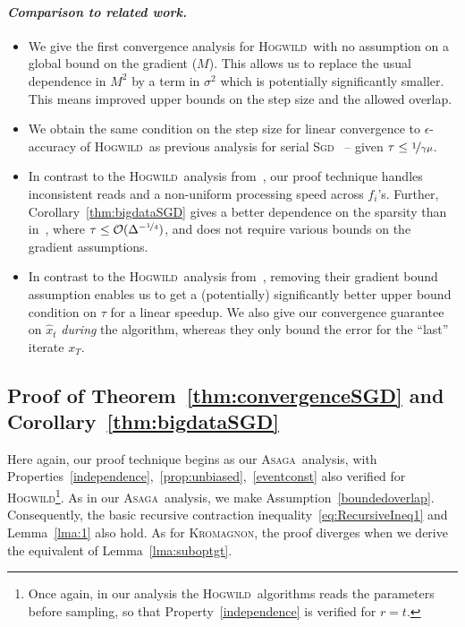 \documentclass[twoside, 11pt]{article}
\newcommand{\stepsize}{\gamma}
\newcommand{\strongconvex}{\mu}
\newcommand{\overlap}{\tau}
\newcommand{\sparsity}{\Delta}
\newcommand{\ASAGA}{\textsc{Asaga}}
\newcommand{\Hogwild}{\textsc{Hogwild}}
\newcommand{\SGD}{\textsc{Sgd}}
\newcommand{\KROMAGNON}{\textsc{Kromagnon}}
\begin{document}
\paragraph{\textit{Comparison to related work.}}
\begin{itemize}[topsep=1mm, itemsep=-1mm]
	\item We give the first convergence analysis for \Hogwild\ with no assumption on a global bound on the gradient ($M$). This allows us to replace the usual dependence in $M^2$ by a term in $\sigma^2$ which is potentially significantly smaller. This means improved upper bounds on the step size and the allowed overlap.
	\item We obtain the same condition on the step size for linear convergence to $\epsilon$-accuracy of \Hogwild\ as previous analysis for serial \SGD~\citep[e.g.][]{srebro} -- given $\overlap \leq \nicefrac{1}{\stepsize \strongconvex}$.
	\item In contrast to the \Hogwild\ analysis from~\citet{hogwild, taming}, our proof technique handles inconsistent reads and a non-uniform processing speed across $f_i$'s.
	Further, Corollary~\ref{thm:bigdataSGD} gives a better dependence on the sparsity than in~\citet{hogwild}, where $\overlap \leq \mathcal{O}(\sparsity^{-\nicefrac{1}{4}})$, and does not require various bounds on the gradient assumptions.
	\item In contrast to the \Hogwild\ analysis from~\citet[Thm. 3]{mania}, removing their gradient bound assumption enables us to get a (potentially) significantly better upper bound condition on $\overlap$ for a linear speedup.
	We also give our convergence guarantee on $\hat{x}_t$ \emph{during} the algorithm, whereas they only bound the error for the ``last'' iterate $x_T$.
\end{itemize}

\subsection{Proof of Theorem~\ref{thm:convergenceSGD} and Corollary~\ref{thm:bigdataSGD}} \label{sec:proofSGD}
Here again, our proof technique begins as our \ASAGA\ analysis, with Properties~\ref{independence},~\ref{prop:unbiased},~\ref{eventconst} also verified for \Hogwild\footnote{Once again, in our analysis the \Hogwild\ algorithms reads the parameters before sampling, so that Property~\ref{independence} is verified for $r=t$.}.
As in our \ASAGA\ analysis, we make Assumption~\ref{boundedoverlap}.
Consequently, the basic recursive contraction inequality~\eqref{eq:RecursiveIneq1} and Lemma~\ref{lma:1} also hold.
As for \KROMAGNON, the proof diverges when we derive the equivalent of Lemma~\ref{lma:suboptgt}.
\end{document}

